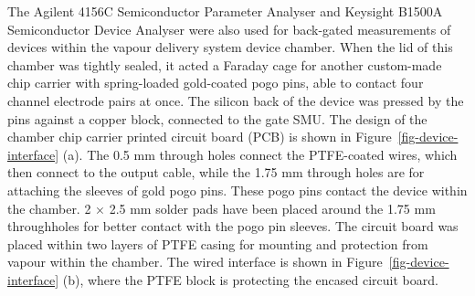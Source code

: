 \documentclass[
  a4paper,
]{scrbook}
\begin{document}
The Agilent 4156C Semiconductor Parameter Analyser and Keysight B1500A
Semiconductor Device Analyser were also used for back-gated measurements
of devices within the vapour delivery system device chamber. When the
lid of this chamber was tightly sealed, it acted a Faraday cage for
another custom-made chip carrier with spring-loaded gold-coated pogo
pins, able to contact four channel electrode pairs at once. The silicon
back of the device was pressed by the pins against a copper block,
connected to the gate SMU. The design of the chamber chip carrier
printed circuit board (PCB) is shown in
Figure~\ref{fig-device-interface} (a). The 0.5 mm through holes connect
the PTFE-coated wires, which then connect to the output cable, while the
1.75 mm through holes are for attaching the sleeves of gold pogo pins.
These pogo pins contact the device within the chamber. 2 × 2.5 mm solder
pads have been placed around the 1.75 mm throughholes for better contact
with the pogo pin sleeves. The circuit board was placed within two
layers of PTFE casing for mounting and protection from vapour within the
chamber. The wired interface is shown in
Figure~\ref{fig-device-interface} (b), where the PTFE block is
protecting the encased circuit board.
\end{document}
